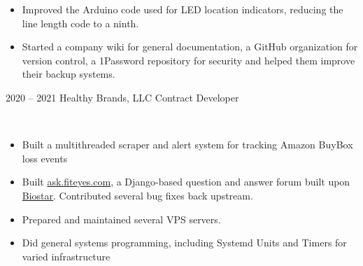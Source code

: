 \documentclass[9pt]{developercv} %
\begin{document}
\begin{entrylist}
{\begin{itemize}[leftmargin=*, noitemsep]
            \item Improved the Arduino code used for LED location indicators, reducing the line length code to a ninth.
            \item Started a company wiki for general documentation, a GitHub organization for version control, a 1Password repository for
            security and helped them improve their backup systems.
            \end{itemize}
        }
    \entry
        {2020 -- 2021}
        {Healthy Brands, LLC}
        {Contract Developer}
        {
            \slashsep
            \slashsep
            \slashsep
            \slashsep
            \slashsep
            \\
            \begin{itemize}[leftmargin=*, noitemsep]
                \item Built a multithreaded scraper and alert system for tracking Amazon BuyBox loss events
                \item Built {\href{https://ask.fiteyes.com}{ask.fiteyes.com}}, a Django-based question and answer forum built upon {\href{https://github.com/ialbert/biostar-central}{Biostar}}. Contributed several bug fixes back upstream.
                \item Prepared and maintained several VPS servers.
                \item Did general systems programming, including Systemd Units and Timers for varied infrastructure
            \end{itemize}
        }


\end{entrylist}
\end{document}
